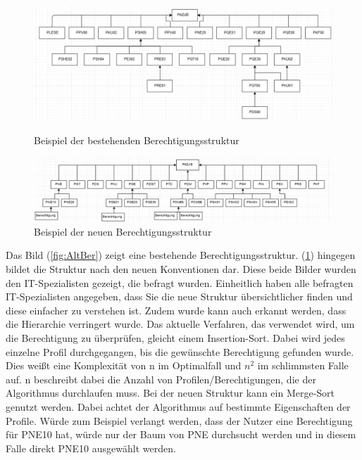 \begin{figure}[h!]
\hspace*{-2cm}
 \centering
 \includegraphics[width=1.25\textwidth]{gfx/Picture/Vorher.PNG}
 \caption{Beispiel der bestehenden Berechtigungsstruktur}
 \label{fig:AltBer}
\hspace*{-2cm}
 \centering
 \includegraphics[width=1.25\textwidth]{gfx/Picture/Nachher.PNG}
 \caption{Beispiel der neuen Berechtigungsstruktur}
 \label{fig:NeuBer}
\end{figure}
Das Bild (\ref{fig:AltBer}) zeigt eine bestehende Berechtigungsstruktur.
(\ref{fig:NeuBer}) hingegen bildet die Struktur nach den neuen Konventionen dar.
Diese beide Bilder wurden den IT-Spezialisten gezeigt, die befragt wurden.
Einheitlich haben alle befragten IT-Spezialisten angegeben, dass Sie die neue Struktur übersichtlicher finden und diese einfacher zu verstehen ist.
Zudem wurde kann auch erkannt werden, dass die Hierarchie verringert wurde.
\newline
Das aktuelle Verfahren, das verwendet wird, um die Berechtigung zu überprüfen, gleicht einem Insertion-Sort.
Dabei wird jedes einzelne Profil durchgegangen, bis die gewünschte Berechtigung gefunden wurde.
Dies weißt eine Komplexität von n im Optimalfall und $n^2$ im schlimmsten Falle auf.
n beschreibt dabei die Anzahl von Profilen/Berechtigungen, die der Algorithmus durchlaufen muss. \cite[12]{log} \cite{weblogMer}
\newline
Bei der neuen Struktur kann ein Merge-Sort genutzt werden.
Dabei achtet der Algorithmus auf bestimmte Eigenschaften der Profile.
Würde zum Beispiel verlangt werden, dass der Nutzer eine Berechtigung für PNE10 hat, würde nur der Baum von PNE durchsucht werden und in diesem Falle direkt PNE10 ausgewählt werden.
